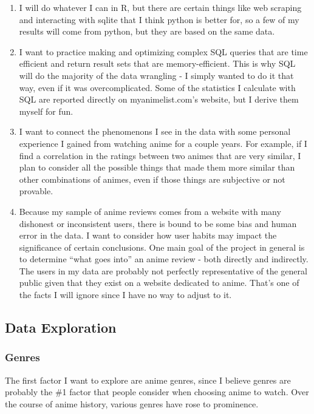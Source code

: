 \documentclass[
]{article}
\providecommand{\tightlist}{%
  \setlength{\itemsep}{0pt}\setlength{\parskip}{0pt}}
\begin{document}
\begin{enumerate}
\def\labelenumi{\arabic{enumi}.}
\tightlist
\item
  I will do whatever I can in R, but there are certain things like web
  scraping and interacting with sqlite that I think python is better
  for, so a few of my results will come from python, but they are based
  on the same data.
\item
  I want to practice making and optimizing complex SQL queries that are
  time efficient and return result sets that are memory-efficient. This
  is why SQL will do the majority of the data wrangling - I simply
  wanted to do it that way, even if it was overcomplicated. Some of the
  statistics I calculate with SQL are reported directly on
  myanimelist.com's website, but I derive them myself for fun.
\item
  I want to connect the phenomenons I see in the data with some personal
  experience I gained from watching anime for a couple years. For
  example, if I find a correlation in the ratings between two animes
  that are very similar, I plan to consider all the possible things that
  made them more similar than other combinations of animes, even if
  those things are subjective or not provable.
\item
  Because my sample of anime reviews comes from a website with many
  dishonest or inconsistent users, there is bound to be some bias and
  human error in the data. I want to consider how user habits may impact
  the significance of certain conclusions. One main goal of the project
  in general is to determine ``what goes into'' an anime review - both
  directly and indirectly. The users in my data are probably not
  perfectly representative of the general public given that they exist
  on a website dedicated to anime. That's one of the facts I will ignore
  since I have no way to adjust to it.
\end{enumerate}

\hypertarget{data-exploration}{%
\subsection{Data Exploration}\label{data-exploration}}

\hypertarget{genres}{%
\subsubsection{Genres}\label{genres}}

The first factor I want to explore are anime genres, since I believe
genres are probably the \#1 factor that people consider when choosing
anime to watch. Over the course of anime history, various genres have
rose to prominence.
\end{document}
